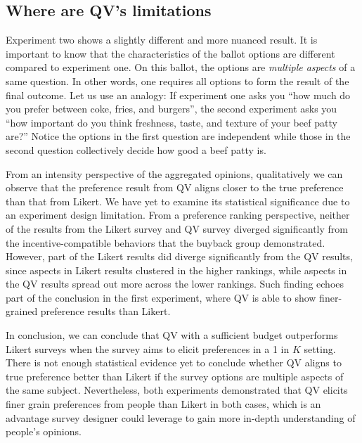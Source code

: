 






\subsection{Where are QV's limitations}
Experiment two shows a slightly different and more nuanced result.
It is important to know that
the characteristics of the ballot options 
are different compared to experiment one.
On this ballot, the options are \textit{multiple aspects}
of a same question.
In other words, 
one requires all options 
to form the result of the final outcome.
Let us use an analogy:
If experiment one asks you
``how much do you prefer between
coke, fries, and burgers'',
the second experiment asks you
``how important do you think
freshness, taste, and texture 
of your beef patty are?''
Notice the options in the first question 
are independent while 
those in the second question 
collectively decide how good a beef patty is.

From an intensity perspective 
of the aggregated opinions, 
qualitatively we can observe that 
the preference result from QV aligns closer 
to the true preference than that from Likert. 
We have yet to examine its statistical significance 
due to an experiment design limitation. 
From a preference ranking perspective, 
neither of the results from the Likert survey 
and QV survey
diverged significantly 
from the incentive-compatible behaviors 
that the buyback group demonstrated. 
However, part of the Likert results 
did diverge significantly from the QV results, 
since aspects in Likert results clustered 
in the higher rankings, 
while aspects in the QV results 
spread out more across the lower rankings. 
Such finding echoes part of the conclusion 
in the first experiment, 
where QV is able to show finer-grained preference results 
than Likert.

In conclusion,
we can conclude that QV with a sufficient budget outperforms Likert surveys when the survey aims to elicit preferences in a 1 in $K$ setting.
There is not enough statistical evidence yet to conclude whether QV aligns to true preference better than Likert if the survey options are multiple aspects of the same subject. Nevertheless, both experiments demonstrated that QV elicits finer grain preferences from people than Likert in both cases, which is an advantage survey designer could leverage to gain more in-depth understanding of people's opinions.

